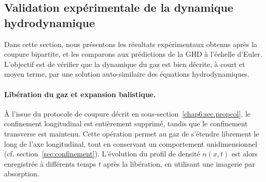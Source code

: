 \subsection{Validation expérimentale de la dynamique hydrodynamique}
\label{sec.don_exp}



Dans cette section, nous présentons les résultats expérimentaux obtenus après la coupure bipartite, et les comparons aux prédictions de la GHD à l’échelle d’Euler. L’objectif est de vérifier que la dynamique du gaz est bien décrite, à court et moyen terme, par une solution auto-similaire des équations hydrodynamiques.


\paragraph{Libération du gaz et expansion balistique.}

À l’issue du protocole de coupure décrit en sous-section~\ref{chap6:sec.propcol}, le confinement longitudinal est entièrement supprimé, tandis que le confinement transverse est maintenu. Cette opération permet au gaz de s’étendre librement le long de l’axe longitudinal, tout en conservant un comportement unidimensionnel (cf. section~\ref{sec:confinement}).
L’évolution du profil de densité $n(x,t)$ est alors enregistrée à différents temps $t$ après la libération, en utilisant une imagerie par absorption.


